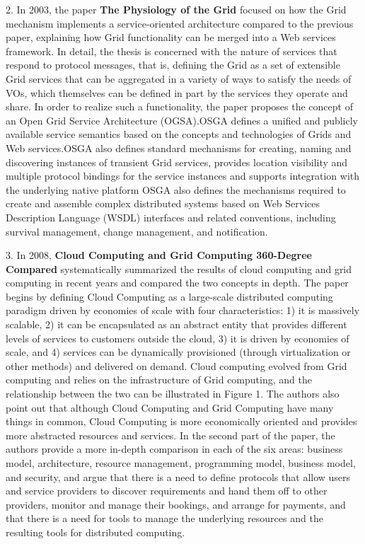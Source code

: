 \documentclass[a4paper,twoside]{scrbook}
\begin{document}
\begin{CJK}{UTF8}{gbsn}
2. In 2003, the paper \textbf{The Physiology of the Grid}\cite{foster2003physiology} focused on how the Grid mechanism implements a service-oriented architecture compared to the previous paper, explaining how Grid functionality can be merged into a Web services framework. In detail, the thesis is concerned with the nature of services that respond to protocol messages, that is, defining the Grid as a set of extensible Grid services that can be aggregated in a variety of ways to satisfy the needs of VOs, which themselves can be defined in part by the services they operate and share. In order to realize such a functionality, the paper proposes the concept of an Open Grid Service Architecture (OGSA).OSGA defines a unified and publicly available service semantics based on the concepts and technologies of Grids and Web services.OSGA also defines standard mechanisms for creating, naming and discovering instances of transient Grid services, provides location visibility and multiple protocol bindings for the service instances and supports integration with the underlying native platform OSGA also defines the mechanisms required to create and assemble complex distributed systems based on Web Services Description Language (WSDL) interfaces and related conventions, including survival management, change management, and notification.

3. In 2008, \textbf{Cloud Computing and Grid Computing 360-Degree Compared}\cite{foster2008cloud} systematically summarized the results of cloud computing and grid computing in recent years and compared the two concepts in depth. The paper begins by defining Cloud Computing as a large-scale distributed computing paradigm driven by economies of scale with four characteristics: 1) it is massively scalable, 2) it can be encapsulated as an abstract entity that provides different levels of services to customers outside the cloud, 3) it is driven by economies of scale, and 4) services can be dynamically provisioned (through virtualization or other methods) and delivered on demand. Cloud computing evolved from Grid computing and relies on the infrastructure of Grid computing, and the relationship between the two can be illustrated in Figure 1. The authors also point out that although Cloud Computing and Grid Computing have many things in common, Cloud Computing is more economically oriented and provides more abstracted resources and services. In the second part of the paper, the authors provide a more in-depth comparison in each of the six areas: business model, architecture, resource management, programming model, business model, and security, and argue that there is a need to define protocols that allow users and service providers to discover requirements and hand them off to other providers, monitor and manage their bookings, and arrange for payments, and that there is a need for tools to manage the underlying resources and the resulting tools for distributed computing.


\end{CJK}
\end{document}

